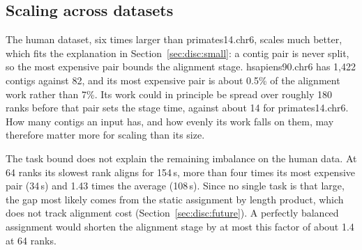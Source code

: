 \subsection{Scaling across datasets}\label{sec:disc:scaling}

The human dataset, six times larger than primates14.chr6, scales much
better, which fits the explanation in Section~\ref{sec:disc:small}: a
contig pair is never split, so the most expensive pair bounds the
alignment stage. hsapiens90.chr6 has 1,422 contigs against 82, and its most
expensive pair is about 0.5\% of the alignment work rather than 7\%. Its
work could in principle be spread over roughly 180 ranks before that pair
sets the stage time, against about 14 for primates14.chr6. How many contigs
an input has, and how evenly its work falls on them, may therefore matter
more for scaling than its size.

The task bound does not explain the remaining imbalance on the human data.
At 64 ranks its slowest rank aligns for 154\,s, more than four times its
most expensive pair (34\,s) and 1.43 times the average (108\,s). Since no
single task is that large, the gap most likely comes from the static
assignment by length product, which does not track alignment cost (Section~\ref{sec:disc:future}). A perfectly balanced
assignment would shorten the alignment stage by at most this factor of
about 1.4 at 64 ranks.
